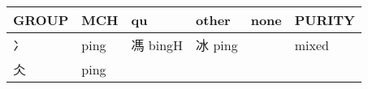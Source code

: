 \documentclass[14pt,a4paper]{scrartcl}
\begin{document}
\begin{longtable}[c]{@{}llllll@{}}
\toprule
\begin{minipage}[b]{0.14\columnwidth}\raggedright\strut
GROUP
\strut\end{minipage} &
\begin{minipage}[b]{0.14\columnwidth}\raggedright\strut
MCH
\strut\end{minipage} &
\begin{minipage}[b]{0.14\columnwidth}\raggedright\strut
qu
\strut\end{minipage} &
\begin{minipage}[b]{0.14\columnwidth}\raggedright\strut
other
\strut\end{minipage} &
\begin{minipage}[b]{0.14\columnwidth}\raggedright\strut
none
\strut\end{minipage} &
\begin{minipage}[b]{0.14\columnwidth}\raggedright\strut
PURITY
\strut\end{minipage}\tabularnewline
\midrule
\endhead
\begin{minipage}[t]{0.14\columnwidth}\raggedright\strut
冫
\strut\end{minipage} &
\begin{minipage}[t]{0.14\columnwidth}\raggedright\strut
ping
\strut\end{minipage} &
\begin{minipage}[t]{0.14\columnwidth}\raggedright\strut
馮 bingH
\strut\end{minipage} &
\begin{minipage}[t]{0.14\columnwidth}\raggedright\strut
冰 ping
\strut\end{minipage} &
\begin{minipage}[t]{0.14\columnwidth}\raggedright\strut
\strut\end{minipage} &
\begin{minipage}[t]{0.14\columnwidth}\raggedright\strut
mixed
\strut\end{minipage}\tabularnewline
\begin{minipage}[t]{0.14\columnwidth}\raggedright\strut
仌
\strut\end{minipage} &
\begin{minipage}[t]{0.14\columnwidth}\raggedright\strut
ping
\strut\end{minipage} &
\begin{minipage}[t]{0.14\columnwidth}\raggedright\strut
\strut\end{minipage} &
\begin{minipage}[t]{0.14\columnwidth}\raggedright\strut

\end{minipage}
\end{longtable}
\end{document}
